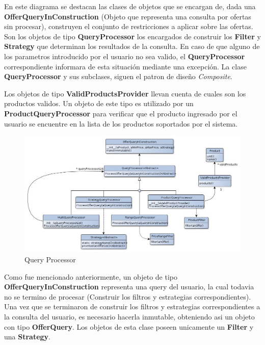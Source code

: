 \documentclass[10pt, a4paper]{article}
\begin{document}
\begin{landscape}

\newpage
En este diagrama se destacan las clases de objetos que se encargan de, dada una \textbf{OfferQueryInConstruction} (Objeto que representa una consulta por ofertas sin procesar), construyen el conjunto de restricciones a aplicar sobre las ofertas. Son los objetos de tipo \textbf{QueryProcessor} los encargados de construir los \textbf{Filter} y \textbf{Strategy} que determinan los resultados de la consulta. En caso de que alguno de los parametros introducido por el usuario no sea valido, el \textbf{QueryProcessor} correspondiente informara de esta situación mediante una excepción. La clase \textbf{QueryProcessor} y sus subclases, siguen el patron de diseño \emph{Composite}.

Los objetos de tipo \textbf{ValidProductsProvider} llevan cuenta de cuales son los productos validos. Un objeto de este tipo es utilizado por un \textbf{ProductQueryProcessor} para verificar que el producto ingresado por el usuario se encuentre en la lista de los productos soportados por el sistema.

\begin{figure}[H]
\centering
\includegraphics[scale=0.65]{graphics/queryProcessor_class.jpg}
\caption{Query Processor}
\end{figure}

\newpage
Como fue mencionado anteriormente, un objeto de tipo \textbf{OfferQueryInConstruction} representa una query del usuario, la cual todavia no se termino de procesar (Construir los filtros y estrategias correspondientes). Una vez que se terminaron de construir los filtros y estrategias correspondientes a la consulta del usuario, es necesario hacerla inmutable, obteniendo asi un objeto con tipo \textbf{OfferQuery}. Los objetos de esta clase poseen unicamente un \textbf{Filter} y una \textbf{Strategy}.


\end{landscape}
\end{document}
